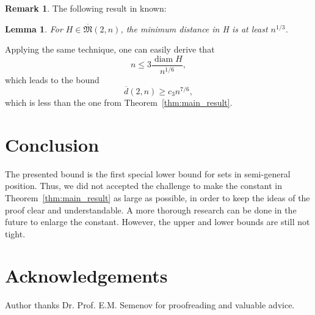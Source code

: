 \documentclass[a4paper,14pt]{article} %
\theoremstyle{plain}
\newtheorem{lemma}[theorem]{Lemma}
\theoremstyle{definition}
\newtheorem{remark}[theorem]{Remark}
\begin{document}
\begin{remark}
	The following result in known:
\end{remark}

\begin{lemma}
	\cite[Corollary 1]{solymosi2003note}
	For $H \in \overline {\mathfrak{M}}(2,n)$, the minimum
	distance in H is at least $n^{1/3}$.
\end{lemma}
Applying the same technique, one can easily derive that
\begin{equation}
	n \leq 3 \frac{\operatorname{diam} H }{n^{1/6}}
	,
\end{equation}
which leads to the bound
\begin{equation}
	\overline{d}(2,n) \geq c_3 n^{7/6}
	,
\end{equation}
which is less than the one from Theorem~\ref{thm:main_result}.


\section{Conclusion}
The presented bound is the first special lower bound for sets in semi-general position.
Thus, we did not accepted the challenge to make the constant in Theorem~\ref{thm:main_result} as large as possible,
in order to keep the ideas of the proof clear and understandable.
A more thorough research can be done in the future to enlarge the constant.
However, the upper and lower bounds are still not tight.

\section{Acknowledgements}
Author thanks Dr. Prof. E.M. Semenov for proofreading and valuable advice.


\printbibliography
\end{document}
